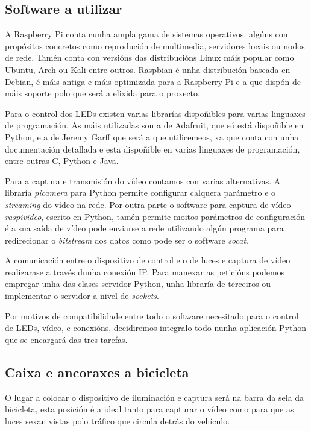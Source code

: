 \subsection{Software a utilizar}
A Raspberry Pi conta cunha ampla gama de sistemas operativos, algúns con propósitos concretos como reprodución de multimedia, servidores locais ou nodos de rede. Tamén conta con versións das distribucións Linux máis popular como Ubuntu, Arch ou Kali entre outros.
Raspbian é unha distribución baseada en Debian, é máis antiga e máis optimizada para a Raspberry Pi e a que dispón de máis soporte polo que será a elixida para o proxecto.

Para o control dos LEDs existen varias librarías dispoñibles para varias linguaxes de programación. As máis utilizadas son a de Adafruit, que só está dispoñible en Python, e a de Jeremy Garff que será a que utilicemeos, xa que conta con unha documentación detallada e esta dispoñible en varias linguaxes de programación, entre outras C, Python e Java.

Para a captura e transmisión do vídeo contamos con varias alternativas. A libraría \emph{picamera} para Python permite configurar calquera parámetro e o \emph{streaming} do vídeo na rede. Por outra parte o software para captura de vídeo \emph{raspivideo}, escrito en Python, tamén permite moitos parámetros de configuración é a sua saída de vídeo pode enviarse a rede utilizando algún programa para redirecionar o \emph{bitstream} dos datos como pode ser o software \emph{socat}.

A comunicación entre o dispositivo de control e o de luces e captura de vídeo realizarase a través dunha conexión IP. Para manexar as peticións podemos empregar unha das clases servidor Python, unha libraría de terceiros ou implementar o servidor a nivel de \emph{sockets}.

Por motivos de compatibilidade entre todo o software necesitado para o control de LEDs, vídeo, e conexións, decidiremos integralo todo nunha aplicación Python que se encargará das tres tarefas.

\subsection{Caixa e ancoraxes a bicicleta}


O lugar a colocar o dispositivo de iluminación e captura será na barra da sela da bicicleta, esta posición é a ideal tanto para capturar o vídeo como para que as luces sexan vistas polo tráfico que circula detrás do vehículo.

